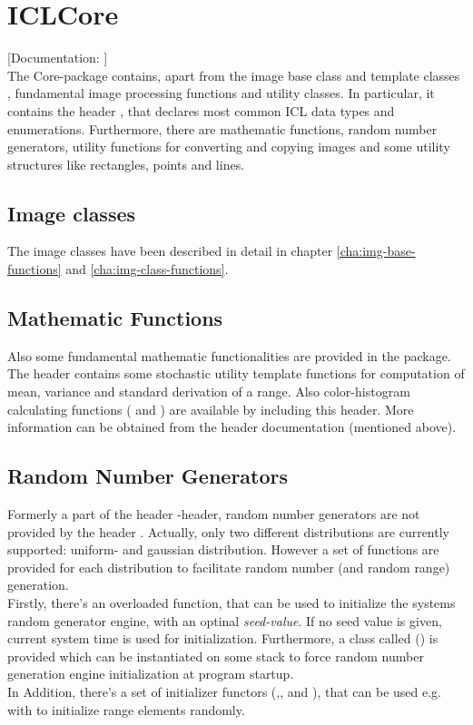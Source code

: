 \section{ICLCore}

[Documentation: ]\\
The Core-package contains, apart from the image base class  and template classes , fundamental image processing functions and utility classes. In particular, it contains the header , that declares most common ICL data types and enumerations. Furthermore, there are mathematic functions, random number generators, utility functions for converting and copying images and some utility structures like rectangles, points and lines.

\subsection{Image classes}
The image classes have been described in detail in chapter \ref{cha:img-base-functions} and \ref{cha:img-class-functions}.


\subsection{Mathematic Functions}
Also some fundamental mathematic functionalities are provided in the package. The header  contains some stochastic utility template functions for computation of mean, variance and standard derivation of a range. Also color-histogram calculating functions ( and ) are available by including this header. More information can be obtained from the header documentation (mentioned above).

\subsection{Random Number Generators}
Formerly a part of the header -header, random number generators are not provided by the header . Actually, only two different distributions are currently supported: uniform- and gaussian distribution. However a set of functions are provided for each distribution to facilitate random number (and random range) generation. \\
Firstly, there's an overloaded  function, that can be used to initialize the systems random generator engine, with an optinal \emph{seed-value}. If no seed value is given, current system time is used for initialization. Furthermore, a class called  () is provided which can be instantiated on some stack to force random number generation engine initialization at program startup. \\
In Addition, there's a set of initializer functors (,, and ), that can be used e.g. with  to initialize range elements randomly. 



